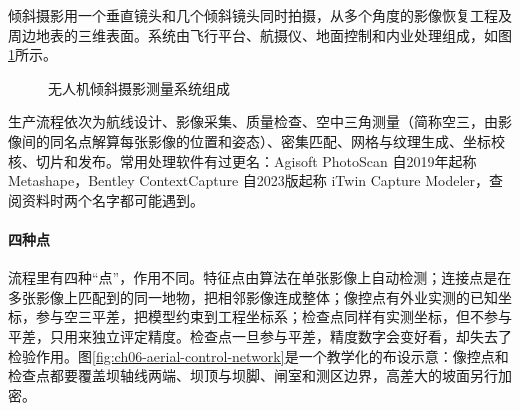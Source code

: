 倾斜摄影用一个垂直镜头和几个倾斜镜头同时拍摄，从多个角度的影像恢复工程及周边地表的三维表面。系统由飞行平台、航摄仪、地面控制和内业处理组成，如图\ref{fig:uav-oblique-system}所示。

\begin{figure}[htbp]
\centering
\uavObliquePhotographySystem
\caption{无人机倾斜摄影测量系统组成}
\label{fig:uav-oblique-system}
\end{figure}

生产流程依次为航线设计、影像采集、质量检查、空中三角测量（简称空三，由影像间的同名点解算每张影像的位置和姿态）、密集匹配、网格与纹理生成、坐标校核、切片和发布。常用处理软件有过更名：Agisoft PhotoScan 自2019年起称 Metashape，Bentley ContextCapture 自2023版起称 iTwin Capture Modeler，查阅资料时两个名字都可能遇到。

\paragraph{四种点}流程里有四种“点”，作用不同。特征点由算法在单张影像上自动检测；连接点是在多张影像上匹配到的同一地物，把相邻影像连成整体；像控点有外业实测的已知坐标，参与空三平差，把模型约束到工程坐标系；检查点同样有实测坐标，但不参与平差，只用来独立评定精度。检查点一旦参与平差，精度数字会变好看，却失去了检验作用。图\ref{fig:ch06-aerial-control-network}是一个教学化的布设示意：像控点和检查点都要覆盖坝轴线两端、坝顶与坝脚、闸室和测区边界，高差大的坡面另行加密。

